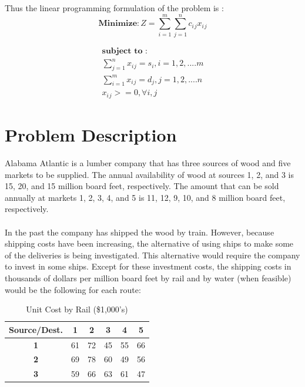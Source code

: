 \documentclass[12pt]{article}
\numberwithin{equation}{section}
\numberwithin{table}{section}
\numberwithin{figure}{section}
\begin{document}
Thus the linear programming formulation of the problem is :
\begin{equation*}
	\textbf{Minimize} : Z = \sum_{i=1}^m \sum_{j=1}^nc{_i}{_j}x{_i}{_j}
\end{equation*}

\begin{equation*}
	\begin{split}
		\textbf{subject to :} \\
		\sum_{j=1}^nx{_i}{_j} = s{_i}, i=1,2,....m \\
		\sum_{i=1}^mx{_i}{_j} = d{_j}, j=1,2,....n \\
		x{_i}{_j}>=0, \forall i,j
	\end{split}
\end{equation*}

\section{Problem Description}
Alabama Atlantic is a lumber company that has three sources of wood and five markets to be supplied. The annual availability of wood at sources 1, 2, and 3 is 15, 20, and 15 million board feet, respectively. The amount that can be sold annually at markets 1, 2, 3, 4, and 5 is 11, 12, 9, 10, and 8 million board feet, respectively.\\ \\
In the past the company has shipped the wood by train. However, because shipping costs have been increasing, the alternative of using ships to make some of the deliveries is being investigated. This alternative would require the company to invest in some ships. Except for these investment costs, the shipping costs in thousands of dollars per million board feet by rail and by water (when feasible) would be the following for each route: \newpage

\begin{table}[h!]
\centering
\caption{Unit Cost by Rail (\$1,000's)}
\label{railcost}
\begin{tabular}{|c|c|c|c|c|c|}
\hline
\textbf{Source/Dest.} & \textbf{1} & \textbf{2} & \textbf{3} & \textbf{4} & \textbf{5} \\ \hline
\textbf{1}            & 61         & 72         & 45         & 55         & 66         \\ \hline
\textbf{2}            & 69         & 78         & 60         & 49         & 56         \\ \hline
\textbf{3}            & 59         & 66         & 63         & 61         & 47         \\ \hline
\end{tabular}
\end{table}
\end{document}
